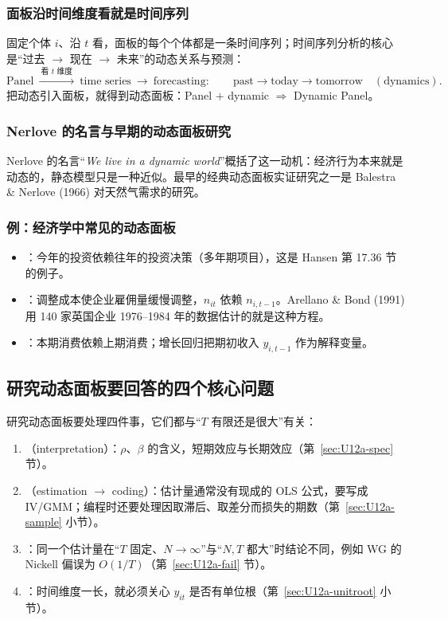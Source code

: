 \subsubsection{面板沿时间维度看就是时间序列}

固定个体 $i$、沿 $t$ 看，面板的每个个体都是一条时间序列；时间序列分析的核心是“过去 $\to$ 现在 $\to$ 未来”的动态关系与预测：
\[
\text{Panel}\ \xrightarrow{\ \text{看 } t\text{ 维度}\ }\ \text{time series}\ \longrightarrow\ \text{forecasting}:\qquad \text{past}\to\text{today}\to\text{tomorrow}\quad(\text{dynamics}).
\]
把动态引入面板，就得到动态面板：Panel $+$ dynamic $\Rightarrow$ Dynamic Panel。

\subsubsection{Nerlove 的名言与早期的动态面板研究}

Nerlove 的名言“\emph{We live in a dynamic world}”概括了这一动机：经济行为本来就是动态的，静态模型只是一种近似。最早的经典动态面板实证研究之一是 Balestra \& Nerlove (1966) 对天然气需求的研究。

\subsubsection{例：经济学中常见的动态面板}

\begin{exmp}[经济学中的动态面板]\label{ex:U12a-apps}
\begin{itemize}
  \item {}：今年的投资依赖往年的投资决策（多年期项目），这是 Hansen 第 17.36 节的例子。
  \item {}：调整成本使企业雇佣量缓慢调整，$n_{it}$ 依赖 $n_{i,t-1}$。Arellano \& Bond (1991) 用 140 家英国企业 1976–1984 年的数据估计的就是这种方程。
  \item {}：本期消费依赖上期消费；增长回归把期初收入 $y_{i,t-1}$ 作为解释变量。
\end{itemize}
\end{exmp}

\subsection{研究动态面板要回答的四个核心问题}

研究动态面板要处理四件事，它们都与“$T$ 有限还是很大”有关：
\begin{enumerate}
  \item {}（interpretation）：$\rho$、$\beta$ 的含义，短期效应与长期效应（第~\ref{sec:U12a-spec} 节）。
  \item {}（estimation $\to$ coding）：估计量通常没有现成的 OLS 公式，要写成 IV/GMM；编程时还要处理因取滞后、取差分而损失的期数（第~\ref{sec:U12a-sample} 小节）。
  \item {}：同一个估计量在“$T$ 固定、$N\to\infty$”与“$N,T$ 都大”时结论不同，例如 WG 的 Nickell 偏误为 $O(1/T)$（第~\ref{sec:U12a-fail} 节）。
  \item {}：时间维度一长，就必须关心 $y_{it}$ 是否有单位根（第~\ref{sec:U12a-unitroot} 小节）。
\end{enumerate}

